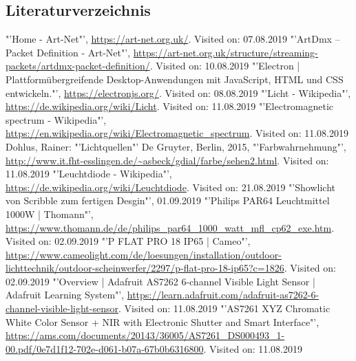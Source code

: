 \documentclass[11pt]{scrartcl}
\begin{document}
\subsection{Literaturverzeichnis}
\begingroup
\renewcommand{\section}[2]{}
\begin{thebibliography}{xxxxxxxxxxxxxxxxxxx}
    "'Home - Art-Net"', \url{https://art-net.org.uk/}. Visited on: 07.08.2019
    "'ArtDmx – Packet Definition - Art-Net"', \url{https://art-net.org.uk/structure/streaming-packets/artdmx-packet-definition/}. Visited on: 10.08.2019
    "'Electron | Plattformübergreifende Desktop-Anwendungen mit JavaScript, HTML und CSS entwickeln."', \url{https://electronjs.org/}. Visited on: 08.08.2019
    "'Licht - Wikipedia"', \url{https://de.wikipedia.org/wiki/Licht}. Visited on: 11.08.2019
    "'Electromagnetic spectrum - Wikipedia"', \url{https://en.wikipedia.org/wiki/Electromagnetic_spectrum}. Visited on: 11.08.2019
     Dohlus, Rainer: "'Lichtquellen"' De Gruyter, Berlin, 2015, 
    "'Farbwahrnehmung"', \url{http://www.it.fht-esslingen.de/~asbeck/gdial/farbe/sehen2.html}. Visited on: 11.08.2019
    "'Leuchtdiode - Wikipedia"', \url{https://de.wikipedia.org/wiki/Leuchtdiode}. Visited on: 21.08.2019
    "'Showlicht von Scribble zum fertigen Desgin"', 01.09.2019
    "'Philips PAR64 Leuchtmittel 1000W | Thomann"', \url{https://www.thomann.de/de/philips_par64_1000_watt_mfl_cp62_exe.htm}. Visited on: 02.09.2019
    "'P FLAT PRO 18 IP65 | Cameo"', \url{https://www.cameolight.com/de/loesungen/installation/outdoor-lichttechnik/outdoor-scheinwerfer/2297/p-flat-pro-18-ip65?c=1826}. Visited on: 02.09.2019
    "'Overview | Adafruit AS7262 6-channel Visible Light Sensor | Adafruit Learning System"', \url{https://learn.adafruit.com/adafruit-as7262-6-channel-visible-light-sensor}. Visited on: 11.08.2019
    "'AS7261 XYZ Chromatic White Color Sensor + NIR with Electronic Shutter and Smart Interface"', \url{https://ams.com/documents/20143/36005/AS7261_DS000493_1-00.pdf/0e7d1f12-702e-d061-b07a-67b0b6316800}. Visited on: 11.08.2019

\end{thebibliography}
\end{document}
